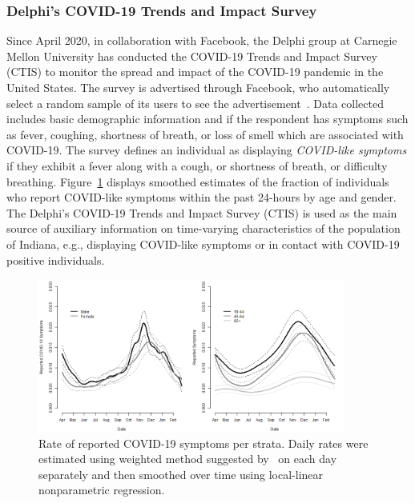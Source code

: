 \documentclass[11pt]{amsart}
\numberwithin{equation}{section}
\theoremstyle{plain}
\begin{document}
 \subsubsection{Delphi's COVID-19 Trends and Impact Survey}
 \label{subsection:fbsymptom}
 Since April 2020, in collaboration with Facebook, the Delphi group at Carnegie Mellon University has conducted the COVID-19 Trends and Impact Survey (CTIS) to monitor the spread and impact of the COVID-19 pandemic in the United States.  The survey is advertised through Facebook, who automatically select a random sample of its users to see the advertisement~\citep{doi:10.1073/pnas.2111454118}.  Data collected includes basic demographic information and if the respondent has symptoms such as fever, coughing, shortness of breath, or loss of smell which are associated with COVID-19.  The survey defines an individual as displaying \emph{COVID-like symptoms} if they exhibit a fever along with a cough, or shortness of breath, or difficulty breathing.  Figure~\ref{fig:fbsymptoms} displays smoothed estimates of the fraction of individuals who report COVID-like symptoms within the past 24-hours by age and gender.  The Delphi's COVID-19 Trends and Impact Survey (CTIS) is used as the main source of auxiliary information on time-varying characteristics of the population of Indiana, e.g., displaying COVID-like symptoms or in contact with COVID-19 positive individuals.

 \begin{figure}[!th]
 \centering
 \includegraphics[width = 0.9\textwidth]{../figs/fbcovid19symptoms.png}
 \caption{Rate of reported COVID-19 symptoms per strata.  Daily rates were estimated using weighted method suggested by~\citep{doi:10.1073/pnas.2111454118} on each day separately and then smoothed over time using local-linear nonparametric regression.}
 \label{fig:fbsymptoms}
 \vspace{-0.3cm}
 \end{figure}
\end{document}
